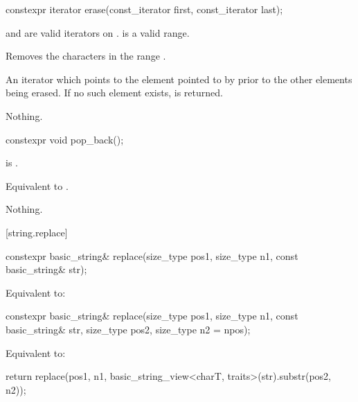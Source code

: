 %
\begin{itemdecl}
constexpr iterator erase(const_iterator first, const_iterator last);
\end{itemdecl}

\begin{itemdescr}
\pnum
\expects
{} and  are valid iterators on
.  is a valid range.

\pnum
\effects
Removes the characters in the range
.

\pnum
\returns
An iterator which points to the element pointed to by  prior to
the other elements being erased.
If no such element exists,
is returned.

\pnum
\throws
Nothing.
\end{itemdescr}

%
\begin{itemdecl}
constexpr void pop_back();
\end{itemdecl}

\begin{itemdescr}
\pnum
\hardexpects
{} is .

\pnum
\effects
Equivalent to .

\pnum
\throws
Nothing.
\end{itemdescr}

[string.replace]{}

%
\begin{itemdecl}
constexpr basic_string& replace(size_type pos1, size_type n1, const basic_string& str);
\end{itemdecl}

\begin{itemdescr}
\pnum
\effects
Equivalent to: 
\end{itemdescr}

%
\begin{itemdecl}
constexpr basic_string& replace(size_type pos1, size_type n1, const basic_string& str,
                                size_type pos2, size_type n2 = npos);
\end{itemdecl}

\begin{itemdescr}
\pnum
\effects
Equivalent to:
\begin{codeblock}
return replace(pos1, n1, basic_string_view<charT, traits>(str).substr(pos2, n2));
\end{codeblock}
\end{itemdescr}

